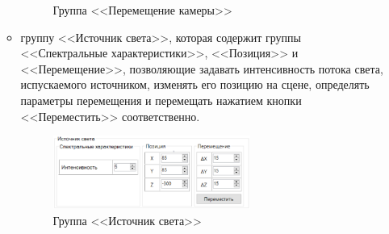 \begin{enumerate}
\begin{itemize}[label=--]
\begin{figure}[h]
			\caption{Группа <<Перемещение камеры>>} 
			\label{fig:camera-move} 
		\end{figure}
		\item группу <<Источник света>>, которая содержит группы <<Спектральные характеристики>>, <<Позиция>> и <<Перемещение>>, позволяющие задавать интенсивность потока света, испускаемого источником, изменять его позицию на сцене, определять параметры перемещения и перемещать нажатием кнопки <<Переместить>> соответственно.
		\begin{figure}[h] 
			\centering
			\includegraphics[width=0.65\textwidth]{images/light.png}
			\caption{Группа <<Источник света>>} 
			\label{fig:light} 
		\end{figure}
	\end{itemize}
\end{enumerate}

